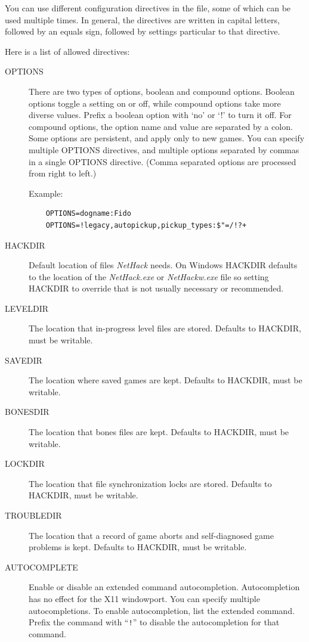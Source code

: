 \documentclass[titlepage]{article}
\begin{document}
You can use different configuration directives in the file, some
of which can be used multiple times.
In general, the directives are
written in capital letters, followed by an equals sign, followed by
settings particular to that directive.

Here is a list of allowed directives:

\begin{description}
\item[OPTIONS]
There are two types of options, boolean and compound options.
Boolean options toggle a setting on or off, while compound options
take more diverse values.
Prefix a boolean option with `no' or `!' to turn it off.
For compound options, the option name and value are separated by a colon.
Some options are persistent, and apply only to new games.
You can specify multiple OPTIONS directives, and multiple options
separated by commas in a single OPTIONS directive.
(Comma separated options are processed from right to left.)

Example:
\begin{verbatim}
    OPTIONS=dogname:Fido
    OPTIONS=!legacy,autopickup,pickup_types:$"=/!?+
\end{verbatim}

\item[HACKDIR]
Default location of files \textit{NetHack} needs. On Windows HACKDIR
defaults to the location of the \textit{NetHack.exe} or \textit{NetHackw.exe} file
so setting HACKDIR to override that is not usually necessary or recommended.
\item[LEVELDIR]
The location that in-progress level files are stored. Defaults to HACKDIR,
must be writable.
\item[SAVEDIR]
The location where saved games are kept. Defaults to HACKDIR, must be
writable.
\item[BONESDIR]
The location that bones files are kept. Defaults to HACKDIR, must be
writable.
\item[LOCKDIR]
The location that file synchronization locks are stored. Defaults to
HACKDIR, must be writable.
\item[TROUBLEDIR]
The location that a record of game aborts and self-diagnosed game problems
is kept. Defaults to HACKDIR, must be writable.
%
%
\item[AUTOCOMPLETE]
Enable or disable an extended command autocompletion.
Autocompletion has no effect for the X11 windowport.
You can specify multiple autocompletions. To enable
autocompletion, list the extended command. Prefix the
command with ``\texttt{!}'' to disable the autocompletion
for that command.


\end{description}
\end{document}
